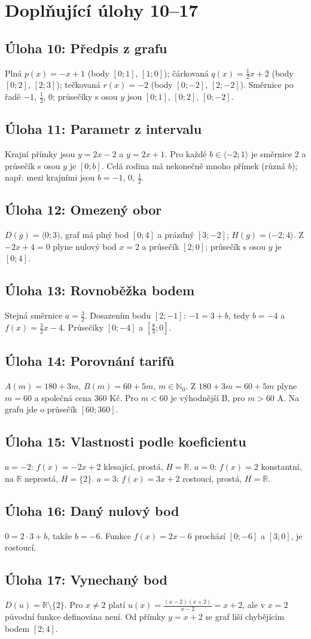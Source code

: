 \documentclass[10pt,a4paper]{article}
\newcommand{\key}[1]{\subsection*{Úloha #1}}
\begin{document}
\section*{Doplňující úlohy 10--17}
\key{10: Předpis z grafu}
Plná $p(x)=-x+1$ (body $[0;1]$, $[1;0]$); čárkovaná
$q(x)=\frac12x+2$ (body $[0;2]$, $[2;3]$);
tečkovaná $r(x)=-2$ (body $[0;-2]$, $[2;-2]$).
Směrnice po řadě $-1$, $\frac12$, $0$; průsečíky s osou $y$ jsou $[0;1]$, $[0;2]$, $[0;-2]$.
\key{11: Parametr z intervalu}
Krajní přímky jsou $y=2x-2$ a $y=2x+1$.
Pro každé $b\in\langle-2;1\rangle$ je směrnice $2$ a průsečík s osou $y$ je $[0;b]$. Celá rodina má nekonečně mnoho přímek (různá $b$); např. mezi krajními jsou $b=-1$, $0$, $\frac12$.
\key{12: Omezený obor}
$D(g)=\langle0;3)$, graf má plný bod $[0;4]$ a prázdný $[3;-2]$;
$H(g)=(-2;4\rangle$. Z $-2x+4=0$ plyne nulový bod $x=2$ a průsečík $[2;0]$;
průsečík s osou $y$ je $[0;4]$.
\key{13: Rovnoběžka bodem}
Stejná směrnice $a=\frac32$. Dosazením bodu $[2;-1]$:
$-1=3+b$, tedy $b=-4$ a $f(x)=\frac32x-4$.
Průsečíky $[0;-4]$ a $[\frac83;0]$.
\key{14: Porovnání tarifů}
$A(m)=180+3m$, $B(m)=60+5m$, $m\in\mathbb N_0$.
Z $180+3m=60+5m$ plyne $m=60$ a společná cena $360$ Kč.
Pro $m<60$ je výhodnější B, pro $m>60$ A. Na grafu jde o průsečík $[60;360]$.
\key{15: Vlastnosti podle koeficientu}
$a=-2$: $f(x)=-2x+2$ klesající, prostá, $H=\mathbb R$.
$a=0$: $f(x)=2$ konstantní, na $\mathbb R$ neprostá, $H=\{2\}$.
$a=3$: $f(x)=3x+2$ rostoucí, prostá, $H=\mathbb R$.
\key{16: Daný nulový bod}
$0=2\cdot3+b$, takže $b=-6$.
Funkce $f(x)=2x-6$ prochází $[0;-6]$ a $[3;0]$, je rostoucí.
\key{17: Vynechaný bod}
$D(u)=\mathbb R\setminus\{2\}$. Pro $x\ne2$ platí
$u(x)=\frac{(x-2)(x+2)}{x-2}=x+2$, ale v $x=2$ původní funkce definována není.
Od přímky $y=x+2$ se graf liší chybějícím bodem $[2;4]$.
\end{document}
